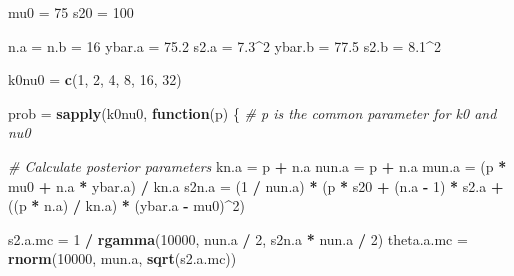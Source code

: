 \documentclass[]{article}
\newenvironment{Shaded}{\begin{snugshade}}{\end{snugshade}}
\newcommand{\CommentTok}[1]{\textcolor[rgb]{0.56,0.35,0.01}{\textit{#1}}}
\newcommand{\ControlFlowTok}[1]{\textcolor[rgb]{0.13,0.29,0.53}{\textbf{#1}}}
\newcommand{\DecValTok}[1]{\textcolor[rgb]{0.00,0.00,0.81}{#1}}
\newcommand{\FloatTok}[1]{\textcolor[rgb]{0.00,0.00,0.81}{#1}}
\newcommand{\KeywordTok}[1]{\textcolor[rgb]{0.13,0.29,0.53}{\textbf{#1}}}
\newcommand{\NormalTok}[1]{#1}
\newcommand{\OperatorTok}[1]{\textcolor[rgb]{0.81,0.36,0.00}{\textbf{#1}}}
\newcommand{\StringTok}[1]{\textcolor[rgb]{0.31,0.60,0.02}{#1}}
\begin{document}
\begin{Shaded}
\begin{Highlighting}[]
\NormalTok{mu0 =}\StringTok{ }\DecValTok{75}
\NormalTok{s20 =}\StringTok{ }\DecValTok{100}

\NormalTok{n.a =}\StringTok{ }\NormalTok{n.b =}\StringTok{ }\DecValTok{16}
\NormalTok{ybar.a =}\StringTok{ }\FloatTok{75.2}
\NormalTok{s2.a =}\StringTok{ }\FloatTok{7.3}\OperatorTok{^}\DecValTok{2}
\NormalTok{ybar.b =}\StringTok{ }\FloatTok{77.5}
\NormalTok{s2.b =}\StringTok{ }\FloatTok{8.1}\OperatorTok{^}\DecValTok{2}

\NormalTok{k0nu0 =}\StringTok{ }\KeywordTok{c}\NormalTok{(}\DecValTok{1}\NormalTok{, }\DecValTok{2}\NormalTok{, }\DecValTok{4}\NormalTok{, }\DecValTok{8}\NormalTok{, }\DecValTok{16}\NormalTok{, }\DecValTok{32}\NormalTok{)}

\NormalTok{prob =}\StringTok{ }\KeywordTok{sapply}\NormalTok{(k0nu0, }\ControlFlowTok{function}\NormalTok{(p) \{}
  \CommentTok{# p is the common parameter for k0 and nu0}
  
  \CommentTok{# Calculate posterior parameters}
\NormalTok{  kn.a =}\StringTok{ }\NormalTok{p }\OperatorTok{+}\StringTok{ }\NormalTok{n.a}
\NormalTok{  nun.a =}\StringTok{ }\NormalTok{p }\OperatorTok{+}\StringTok{ }\NormalTok{n.a}
\NormalTok{  mun.a =}\StringTok{ }\NormalTok{(p }\OperatorTok{*}\StringTok{ }\NormalTok{mu0 }\OperatorTok{+}\StringTok{ }\NormalTok{n.a }\OperatorTok{*}\StringTok{ }\NormalTok{ybar.a) }\OperatorTok{/}\StringTok{ }\NormalTok{kn.a}
\NormalTok{  s2n.a =}\StringTok{ }\NormalTok{(}\DecValTok{1} \OperatorTok{/}\StringTok{ }\NormalTok{nun.a) }\OperatorTok{*}\StringTok{ }\NormalTok{(p }\OperatorTok{*}\StringTok{ }\NormalTok{s20 }\OperatorTok{+}\StringTok{ }\NormalTok{(n.a }\OperatorTok{-}\StringTok{ }\DecValTok{1}\NormalTok{) }\OperatorTok{*}\StringTok{ }\NormalTok{s2.a }\OperatorTok{+}\StringTok{ }\NormalTok{((p }\OperatorTok{*}\StringTok{ }\NormalTok{n.a) }\OperatorTok{/}\StringTok{ }\NormalTok{kn.a) }\OperatorTok{*}\StringTok{ }\NormalTok{(ybar.a }\OperatorTok{-}\StringTok{ }\NormalTok{mu0)}\OperatorTok{^}\DecValTok{2}\NormalTok{)}
  
\NormalTok{  s2.a.mc =}\StringTok{ }\DecValTok{1} \OperatorTok{/}\StringTok{ }\KeywordTok{rgamma}\NormalTok{(}\DecValTok{10000}\NormalTok{, nun.a }\OperatorTok{/}\StringTok{ }\DecValTok{2}\NormalTok{, s2n.a }\OperatorTok{*}\StringTok{ }\NormalTok{nun.a }\OperatorTok{/}\StringTok{ }\DecValTok{2}\NormalTok{)}
\NormalTok{  theta.a.mc =}\StringTok{ }\KeywordTok{rnorm}\NormalTok{(}\DecValTok{10000}\NormalTok{, mun.a, }\KeywordTok{sqrt}\NormalTok{(s2.a.mc))}
  

\end{Highlighting}
\end{Shaded}
\end{document}
